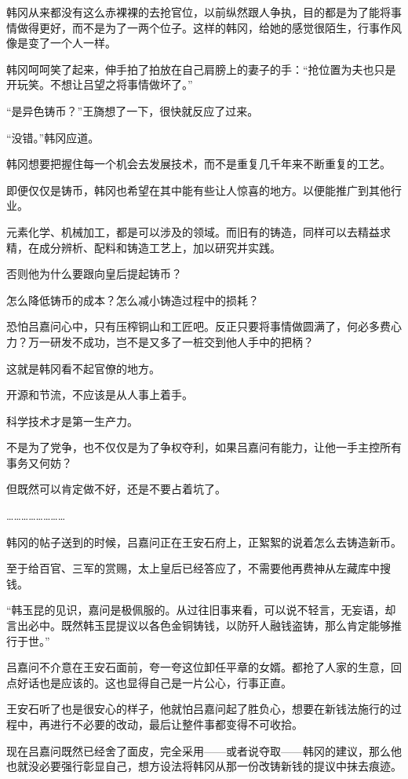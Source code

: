 韩冈从来都没有这么赤裸裸的去抢官位，以前纵然跟人争执，目的都是为了能将事情做得更好，而不是为了一两个位子。这样的韩冈，给她的感觉很陌生，行事作风像是变了一个人一样。

韩冈呵呵笑了起来，伸手拍了拍放在自己肩膀上的妻子的手：“抢位置为夫也只是开玩笑。不想让吕望之将事情做坏了。”

“是异色铸币？”王旖想了一下，很快就反应了过来。

“没错。”韩冈应道。

韩冈想要把握住每一个机会去发展技术，而不是重复几千年来不断重复的工艺。

即便仅仅是铸币，韩冈也希望在其中能有些让人惊喜的地方。以便能推广到其他行业。

元素化学、机械加工，都是可以涉及的领域。而旧有的铸造，同样可以去精益求精，在成分辨析、配料和铸造工艺上，加以研究并实践。

否则他为什么要跟向皇后提起铸币？

怎么降低铸币的成本？怎么减小铸造过程中的损耗？

恐怕吕嘉问心中，只有压榨铜山和工匠吧。反正只要将事情做圆满了，何必多费心力？万一研发不成功，岂不是又多了一桩交到他人手中的把柄？

这就是韩冈看不起官僚的地方。

开源和节流，不应该是从人事上着手。

科学技术才是第一生产力。

不是为了党争，也不仅仅是为了争权夺利，如果吕嘉问有能力，让他一手主控所有事务又何妨？

但既然可以肯定做不好，还是不要占着坑了。

……………………

韩冈的帖子送到的时候，吕嘉问正在王安石府上，正絮絮的说着怎么去铸造新币。

至于给百官、三军的赏赐，太上皇后已经答应了，不需要他再费神从左藏库中搜钱。

“韩玉昆的见识，嘉问是极佩服的。从过往旧事来看，可以说不轻言，无妄语，却言出必中。既然韩玉昆提议以各色金铜铸钱，以防歼人融钱盗铸，那么肯定能够推行于世。”

吕嘉问不介意在王安石面前，夸一夸这位卸任平章的女婿。都抢了人家的生意，回点好话也是应该的。这也显得自己是一片公心，行事正直。

王安石听了也是很安心的样子，他就怕吕嘉问起了胜负心，想要在新钱法施行的过程中，再进行不必要的改动，最后让整件事都变得不可收拾。

现在吕嘉问既然已经舍了面皮，完全采用——或者说夺取——韩冈的建议，那么他也就没必要强行彰显自己，想方设法将韩冈从那一份改铸新钱的提议中抹去痕迹。

